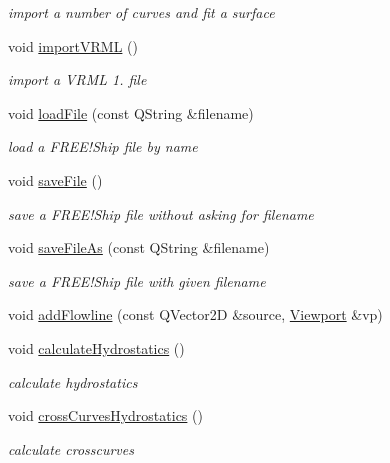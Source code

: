 \begin{DoxyCompactItemize}
\begin{DoxyCompactList}\small\item\em import a number of curves and fit a surface \end{DoxyCompactList}\item 
void \hyperlink{classShipCAD_1_1Controller_a52d924f36259b6ec401acb6165922dc2}{import\+V\+R\+ML} ()
\begin{DoxyCompactList}\small\item\em import a V\+R\+ML 1. file \end{DoxyCompactList}\item 
void \hyperlink{classShipCAD_1_1Controller_a7415bce07d64323be6b9d97885aa0875}{load\+File} (const Q\+String \&filename)
\begin{DoxyCompactList}\small\item\em load a F\+R\+E\+E!\+Ship file by name \end{DoxyCompactList}\item 
void \hyperlink{classShipCAD_1_1Controller_a4dbd04dffa55a42ec77f15d45909d55c}{save\+File} ()
\begin{DoxyCompactList}\small\item\em save a F\+R\+E\+E!\+Ship file without asking for filename \end{DoxyCompactList}\item 
void \hyperlink{classShipCAD_1_1Controller_a619f8330daabbb575976910e7132c4d9}{save\+File\+As} (const Q\+String \&filename)
\begin{DoxyCompactList}\small\item\em save a F\+R\+E\+E!\+Ship file with given filename \end{DoxyCompactList}\item 
void \hyperlink{classShipCAD_1_1Controller_acdf0f8352ab57d4b52c40193f031909b}{add\+Flowline} (const Q\+Vector2D \&source, \hyperlink{classShipCAD_1_1Viewport}{Viewport} \&vp)
\item 
void \hyperlink{classShipCAD_1_1Controller_a3b4ee09db0e5df18f9f5d58048156117}{calculate\+Hydrostatics} ()
\begin{DoxyCompactList}\small\item\em calculate hydrostatics \end{DoxyCompactList}\item 
void \hyperlink{classShipCAD_1_1Controller_a8e45334c9b25b8241ef4af126f6d5cc0}{cross\+Curves\+Hydrostatics} ()
\begin{DoxyCompactList}\small\item\em calculate crosscurves \end{DoxyCompactList}\item 

\end{DoxyCompactItemize}
